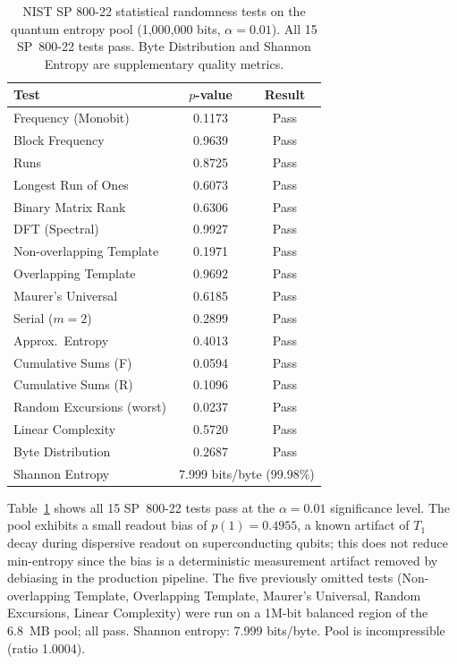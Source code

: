 \documentclass[acmsmall,screen,review,anonymous]{acmart}
\begin{document}
\begin{table}[t]
\caption{NIST SP 800-22 statistical randomness tests on the quantum entropy pool (1,000,000 bits, $\alpha = 0.01$). All 15 SP~800-22 tests pass. Byte Distribution and Shannon Entropy are supplementary quality metrics.}
\label{tab:nist}
\begin{center}
\begin{tabular}{@{}lcc@{}}
\toprule
\textbf{Test} & \textbf{$p$-value} & \textbf{Result} \\
\midrule
Frequency (Monobit) & 0.1173 & Pass \\
Block Frequency     & 0.9639 & Pass \\
Runs                & 0.8725 & Pass \\
Longest Run of Ones & 0.6073 & Pass \\
Binary Matrix Rank  & 0.6306 & Pass \\
DFT (Spectral)      & 0.9927 & Pass \\
Non-overlapping Template & 0.1971 & Pass \\
Overlapping Template & 0.9692 & Pass \\
Maurer's Universal  & 0.6185 & Pass \\
Serial ($m{=}2$)    & 0.2899 & Pass \\
Approx.\ Entropy    & 0.4013 & Pass \\
Cumulative Sums (F) & 0.0594 & Pass \\
Cumulative Sums (R) & 0.1096 & Pass \\
Random Excursions (worst) & 0.0237 & Pass \\
Linear Complexity   & 0.5720 & Pass \\
\midrule
Byte Distribution   & 0.2687 & Pass \\
Shannon Entropy     & \multicolumn{2}{c}{7.999 bits/byte (99.98\%)} \\
\bottomrule
\end{tabular}
\end{center}
\end{table}

Table~\ref{tab:nist} shows all 15 SP~800-22 tests pass at the $\alpha = 0.01$ significance level. The pool exhibits a small readout bias of $p(1) = 0.4955$, a known artifact of $T_1$ decay during dispersive readout on superconducting qubits; this does not reduce min-entropy since the bias is a deterministic measurement artifact removed by debiasing in the production pipeline. The five previously omitted tests (Non-overlapping Template, Overlapping Template, Maurer's Universal, Random Excursions, Linear Complexity) were run on a 1M-bit balanced region of the 6.8~MB pool; all pass. Shannon entropy: 7.999 bits/byte. Pool is incompressible (ratio 1.0004).
\end{document}
